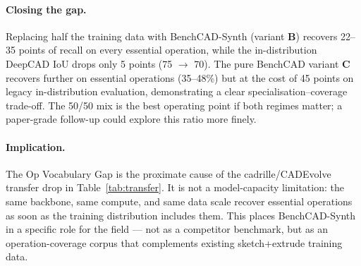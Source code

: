 \documentclass{article}
\begin{document}
\paragraph{Closing the gap.} Replacing half the training data with BenchCAD-Synth (variant \textbf{B}) recovers 22--35 points of recall on every essential operation, while the in-distribution DeepCAD IoU drops only 5 points (75 $\to$ 70). The pure BenchCAD variant \textbf{C} recovers further on essential operations (35--48\%) but at the cost of 45 points on legacy in-distribution evaluation, demonstrating a clear specialisation--coverage trade-off. The 50/50 mix is the best operating point if both regimes matter; a paper-grade follow-up could explore this ratio more finely.

\paragraph{Implication.} The Op Vocabulary Gap is the proximate cause of the cadrille/CADEvolve transfer drop in Table~\ref{tab:transfer}. It is not a model-capacity limitation: the same backbone, same compute, and same data scale recover essential operations as soon as the training distribution includes them. This places BenchCAD-Synth in a specific role for the field --- not as a competitor benchmark, but as an operation-coverage corpus that complements existing sketch+extrude training data.
\end{document}
